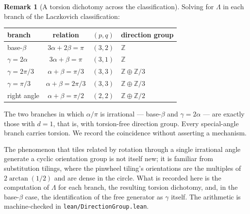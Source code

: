\documentclass[11pt,reqno]{amsart}
\theoremstyle{plain}
\theoremstyle{definition}
\newtheorem{remark}[theorem]{Remark}
\newcommand{\Z}{\mathbb{Z}}
\begin{document}
\begin{remark}[A torsion dichotomy across the classification]\label{rem:torsion}
Solving for $\Lambda$ in each branch of the Laczkovich classification:
\begin{center}
\begin{tabular}{lccl}
\toprule
branch & relation & $(p,q)$ & direction group\\
\midrule
base-$\beta$      & $3\alpha+2\beta=\pi$   & $(3,2)$ & $\Z$\\
$\gamma=2\alpha$  & $3\alpha+\beta=\pi$    & $(3,1)$ & $\Z$\\
$\gamma=2\pi/3$   & $\alpha+\beta=\pi/3$   & $(3,3)$ & $\Z\oplus\Z/3$\\
$\gamma=\pi/3$    & $\alpha+\beta=2\pi/3$  & $(3,3)$ & $\Z\oplus\Z/3$\\
right angle       & $\alpha+\beta=\pi/2$   & $(2,2)$ & $\Z\oplus\Z/2$\\
\bottomrule
\end{tabular}
\end{center}
The two branches in which $\alpha/\pi$ is irrational --- base-$\beta$ and $\gamma=2\alpha$ --- are
exactly those with $d=1$, that is, with torsion-free direction group. Every special-angle branch
carries torsion. We record the coincidence without asserting a mechanism.

The phenomenon that tiles related by rotation through a single irrational angle generate a cyclic
orientation group is not itself new; it is familiar from substitution tilings, where the pinwheel
tiling's orientations are the multiples of $2\arctan(1/2)$ and are dense in the circle. What is
recorded here is the computation of $\Lambda$ for each branch, the resulting torsion dichotomy, and,
in the base-$\beta$ case, the identification of the free generator as $\gamma$ itself. The arithmetic
is machine-checked in \textup{\texttt{lean/DirectionGroup.lean}}.
\end{remark}
\end{document}
